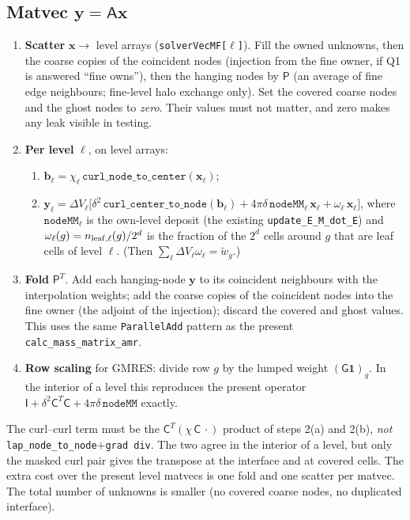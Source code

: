 \documentclass[a4paper,11pt]{article}
\newcommand{\code}[1]{\texttt{#1}}
\newcommand{\Pm}{\mathsf{P}}
\newcommand{\Cm}{\mathsf{C}}
\newcommand{\Gm}{\mathsf{G}}
\newcommand{\Am}{\mathsf{A}}
\begin{document}
\subsection{Matvec $\mathbf y=\Am\mathbf x$}
\begin{enumerate}
\item \textbf{Scatter} $\mathbf x\to$ level arrays (\code{solverVecMF[$\ell$]}). Fill the
  owned unknowns, then the coarse copies of the coincident nodes (injection from the
  fine owner, if Q1 is answered ``fine owns''), then the hanging nodes by $\Pm$ (an
  average of fine edge neighbours; fine-level halo exchange only). Set the covered
  coarse nodes and the ghost nodes to \emph{zero}. Their values must not matter, and
  zero makes any leak visible in testing.
\item \textbf{Per level} $\ell$, on level arrays:
  \begin{enumerate}
  \item $\mathbf b_\ell=\chi_\ell\,\code{curl\_node\_to\_center}(\mathbf x_\ell)$;
  \item $\mathbf y_\ell=\Delta V_\ell\bigl[\delta^2\,\code{curl\_center\_to\_node}(\mathbf b_\ell)
    +4\pi\delta\,\code{nodeMM}_\ell\,\mathbf x_\ell+\omega_\ell\,\mathbf x_\ell\bigr]$, where
    $\code{nodeMM}_\ell$ is the own-level deposit (the existing
    \code{update\_E\_M\_dot\_E}) and $\omega_\ell(g)=n_{\rm leaf,\ell}(g)/2^d$ is the
    fraction of the $2^d$ cells around $g$ that are leaf cells of level $\ell$.
    (Then $\sum_\ell\Delta V_\ell\omega_\ell=\tilde w_g$.)
  \end{enumerate}
\item \textbf{Fold} $\Pm^T$. Add each hanging-node $\mathbf y$ to its coincident neighbours
  with the interpolation weights; add the coarse copies of the coincident nodes into
  the fine owner (the adjoint of the injection); discard the covered and ghost values.
  This uses the same \code{ParallelAdd} pattern as the present
  \code{calc\_mass\_matrix\_amr}.
\item \textbf{Row scaling} for GMRES: divide row $g$ by the lumped weight $(\Gm\mathbf 1)_g$.
  In the interior of a level this reproduces the present operator
  $\mathsf I+\delta^2\Cm^T\Cm+4\pi\delta\,\code{nodeMM}$ exactly.
\end{enumerate}
The curl--curl term must be the $\Cm^T(\chi\,\Cm\,\cdot)$ product of steps 2(a) and 2(b),
\emph{not} \code{lap\_node\_to\_node}$+$\code{grad\,div}. The two agree in the interior
of a level, but only the masked curl pair gives the transpose at the interface and at
covered cells. The extra cost over the present level matvecs is one fold and
one scatter per matvec. The total number of unknowns is smaller (no covered coarse
nodes, no duplicated interface).
\end{document}
